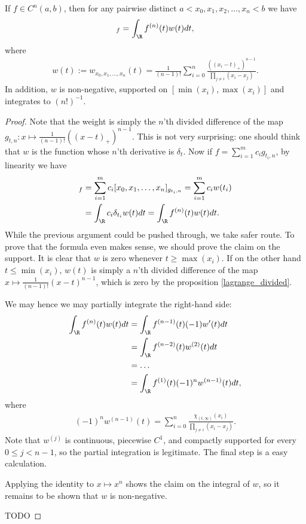\begin{lause}
	If $f \in C^{n}(a, b)$, then for any pairwise distinct $a < x_{0}, x_{1}, x_{2}, \ldots, x_{n} < b$ we have
	\begin{align*}
		[x_{0}, x_{1}, \ldots, x_{n}]_{f} = \int_{\R} f^{(n)}(t) w(t) dt,
	\end{align*}
	where
	\begin{align*}
		w(t) := w_{x_{0}, x_{1}, \ldots, x_{n}}(t) = \frac{1}{(n - 1)!}\sum_{i = 0}^{n} \frac{((x_{i} - t)_{+})^{n - 1}}{\prod_{j \neq i} (x_{i} - x_{j})}.
	\end{align*}
	In addition, $w$ is non-negative, supported on $[\min(x_{i}), \max(x_{i})]$ and integrates to $(n!)^{-1}$.
\end{lause}
\begin{proof}
	Note that the weight is simply the $n$'th divided difference of the map $g_{t, n} : x \mapsto \frac{1}{(n - 1)!}((x - t)_{+})^{n - 1}$. This is not very surprising: one should think that $w$ is the function whose $n$'th derivative is $\delta_{t}$. Now if $f = \sum_{i = 1}^{m} c_{i} g_{t_{i}, n}$, by linearity we have
	\begin{align*}
		[x_{0}, x_{1}, \ldots, x_{n}]_{f} &=\sum_{i = 1}^{m} c_{i} [x_{0}, x_{1}, \ldots, x_{n}]_{g_{t_{i}, n}} =\sum_{i = 1}^{m} c_{i} w(t_{i}) \\
		&=\int_{\R} c_{i} \delta_{t_{i}} w(t) dt =\int_{\R} f^{(n)}(t) w(t) dt.
	\end{align*}
	While the previous argument could be pushed through, we take safer route. To prove that the formula even makes sense, we should prove the claim on the support. It is clear that $w$ is zero whenever $t \geq \max(x_{i})$. If on the other hand $t \leq \min(x_{i})$, $w(t)$ is simply a $n$'th divided difference of the map $x \mapsto \frac{1}{(n - 1)!}(x - t)^{n - 1}$, which is zero by the proposition \ref{lagrange_divided}.

	We may hence we may partially integrate the right-hand side:
	\begin{align*}
		 \int_{\R} f^{(n)}(t) w(t) dt &= \int_{\R} f^{(n - 1)}(t) (-1) w'(t) dt \\
		 &= \int_{\R} f^{(n - 2)}(t) w^{(2)}(t) dt \\
		 &= \ldots \\
		 &= \int_{\R} f^{(1)}(t) (-1)^{n} w^{(n - 1)}(t) dt,
	\end{align*}
	where
	\begin{align*}
		(-1)^{n} w^{(n - 1)}(t) = \sum_{i = 0}^{n} \frac{\chi_{(t, \infty)}(x_{i})}{\prod_{j \neq i} (x_{i} - x_{j})}.
	\end{align*}
	Note that $w^{(j)}$ is continuous, piecewise $C^{1}$, and compactly supported for every $0 \leq j < n - 1$, so the partial integration is legitimate. The final step is a easy calculation.

	Applying the identity to $x \mapsto x^{n}$ shows the claim on the integral of $w$, so it remains to be shown that $w$ is non-negative.

	TODO

\end{proof}

